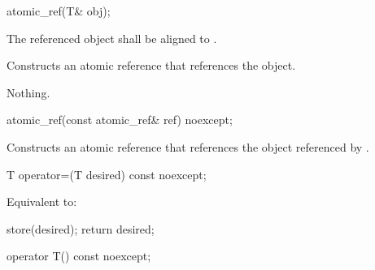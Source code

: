 %
%
%
%
\begin{itemdecl}
atomic_ref(T& obj);
\end{itemdecl}

\begin{itemdescr}
\pnum
\requires The referenced object shall be aligned to .

\pnum
\effects Constructs an atomic reference that references the object.

\pnum
\throws Nothing.
\end{itemdescr}

%
%
%
%
\begin{itemdecl}
atomic_ref(const atomic_ref& ref) noexcept;
\end{itemdecl}

\begin{itemdescr}
\pnum
\effects Constructs an atomic reference
that references the object referenced by .
\end{itemdescr}

%
%
%
%
\begin{itemdecl}
T operator=(T desired) const noexcept;
\end{itemdecl}

\begin{itemdescr}
\pnum
\effects Equivalent to:
\begin{codeblock}
store(desired);
return desired;
\end{codeblock}
\end{itemdescr}

%
%
%
%
\begin{itemdecl}
operator T() const noexcept;
\end{itemdecl}

